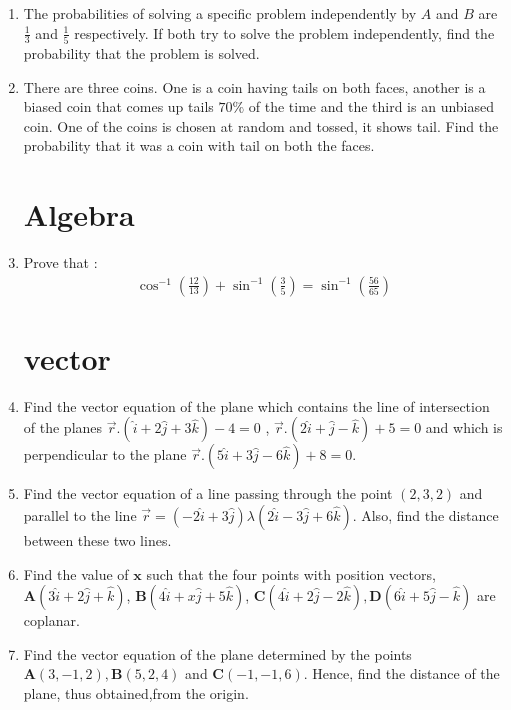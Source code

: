 \documentclass[10pt,-letter paper]{article}
\let\vec\mathbf{}
\let\vec\mathbf{}
\let\vec\mathbf{}
\providecommand{\brak}[1]{\ensuremath{\left(#1\right)}}
\begin{document}
\begin{enumerate}
\item The probabilities of solving a specific problem independently by $A$ and $B$ are $\frac{1}{3}$ and $\frac{1}{5}$ respectively. If both try to solve the problem independently, find the probability that the problem is solved.

\item There are three coins. One is a coin having tails on both faces, another is a biased coin that comes up tails $70\%$ of the time and the third is an unbiased coin. One of the coins is chosen at random and tossed, it shows tail. Find the probability that it was a coin with tail on both the faces.

\section{Algebra}
\item Prove that :
\begin{align*}
\cos^{-1}\brak{\frac{12}{13}}+\sin^{-1}\brak{\frac{3}{5}}=\sin^{-1} \brak{\frac{56}{65}}
\end{align*}

\section{vector}
\item Find the vector equation of the plane which contains the line of intersection of the planes 
$ \overrightarrow{r}.\brak{\hat{i} + 2\hat{j}+3\hat{k}}-4=0$ , $\overrightarrow{r}.
\brak{2\hat{i} + \hat{j} - \hat{k}}+5=0$ and which is perpendicular to the plane $\overrightarrow{r}.\brak{5\hat{i} + 3\hat{j} - 6\hat{k}}+8=0$.

\item Find the vector equation of a line passing through the point
$\brak{2, 3, 2}$ and parallel to the line
$\overrightarrow{r}=\brak{-2\hat{i} +3\hat{j}}\lambda\brak{2\hat{i} - 3\hat{j}+6\hat{k}}$.
Also, find the distance between these two lines.

\item Find the value of $\vec{x}$ such that the four points with position vectors,
$\vec{A}\brak{3\hat{i} + 2\hat{j} + \hat{k}}$, $\vec{B}\brak{4\hat{i} + x\hat{j} + 5\hat{k}}$,   
$\vec{C}\brak{4\hat{i} + 2\hat{j} -2 \hat{k}}, \vec{D}\brak{6\hat{i} + 5\hat{j} - \hat{k}}$ are coplanar.

\item Find the vector equation of the plane determined by the points $\vec{A}\brak{3, -1, 2}, \vec{B}\brak{5, 2, 4}$ and $\vec{C}\brak{-1, -1, 6}$. Hence, find the distance of the plane, thus obtained,from the origin.


\end{enumerate}
\end{document}
